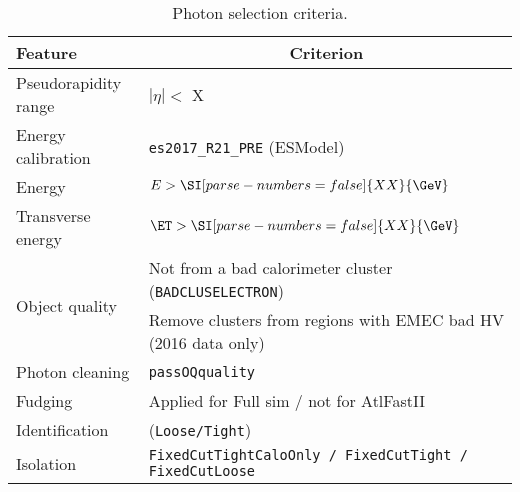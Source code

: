 \begin{table}[ht]
  \caption{Photon selection criteria.}%
  \label{tab:object:photon} 
  \centering
  \begin{tabular}{ll}
    \toprule
    Feature & \multicolumn{1}{c}{Criterion} \\
    \midrule
    Pseudorapidity range & \(|\eta| <\) X\\
    Energy calibration & \texttt{es2017\_R21\_PRE} (ESModel)\\
    Energy & \(E > \SI[parse-numbers=false]{XX}{\GeV}\) \\
    Transverse energy & \(\ET > \SI[parse-numbers=false]{XX}{\GeV}\) \\
    \midrule
    \multirow{2}{*}{Object quality} & Not from a bad calorimeter cluster (\texttt{BADCLUSELECTRON})\\ %
      & Remove clusters from regions with EMEC bad HV (2016 data only) \\
    \midrule
    Photon cleaning & \texttt{passOQquality} \\
    Fudging & Applied for Full sim / not for AtlFastII \\
    \midrule
    Identification & (\texttt{Loose/Tight}) \\
    Isolation &  \texttt{FixedCutTightCaloOnly / FixedCutTight / FixedCutLoose} \\
    \bottomrule
  \end{tabular}
\end{table}

